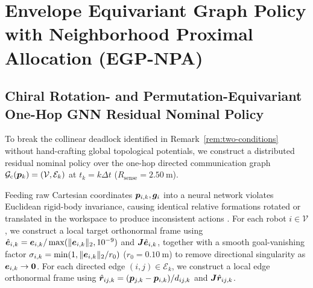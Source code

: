 \section{Envelope Equivariant Graph Policy with Neighborhood Proximal Allocation (EGP-NPA)}\label{sec:method}

\subsection{Chiral Rotation- and Permutation-Equivariant One-Hop GNN Residual Nominal Policy}\label{subsec:gnn-arch}
To break the collinear deadlock identified in Remark~\ref{rem:two-conditions} without hand-crafting global topological potentials, we construct a distributed residual nominal policy over the one-hop directed communication graph $\mathcal G_{\mathrm c}(\boldsymbol{p}_k)=(\mathcal V,\mathcal E_k)$ at $t_k=k\Delta t$ ($R_{\mathrm{sense}}=2.50\ \mathrm m$).

Feeding raw Cartesian coordinates $\boldsymbol{p}_{i,k},\boldsymbol{g}_i$ into a neural network violates Euclidean rigid-body invariance, causing identical relative formations rotated or translated in the workspace to produce inconsistent actions \cite{satorras2021egnn}. For each robot $i\in\mathcal V$, we construct a local target orthonormal frame using $\hat{\boldsymbol{e}}_{i,k}=\boldsymbol{e}_{i,k}/\max(\lVert\boldsymbol{e}_{i,k}\rVert_2,10^{-9})$ and $\boldsymbol{J}\hat{\boldsymbol{e}}_{i,k}$, together with a smooth goal-vanishing factor $\sigma_{i,k}=\min(1,\lVert\boldsymbol{e}_{i,k}\rVert_2/r_0)$ ($r_0=0.10\ \mathrm m$) to remove directional singularity as $\boldsymbol{e}_{i,k}\to\boldsymbol 0$. For each directed edge $(i,j)\in\mathcal E_k$, we construct a local edge orthonormal frame using $\hat{\boldsymbol{r}}_{ij,k}=(\boldsymbol{p}_{j,k}-\boldsymbol{p}_{i,k})/d_{ij,k}$ and $\boldsymbol{J}\hat{\boldsymbol{r}}_{ij,k}$.

